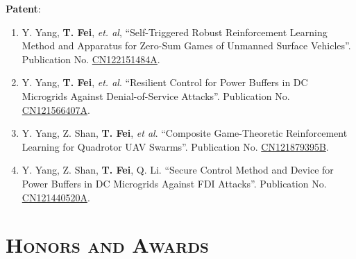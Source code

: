 \documentclass[a4paper,11pt]{article}
\begin{document}
\begin{itemize}[leftmargin=0in, label={}]
  \small{\item{\textbf{Patent}:}}
  \begin{enumerate}[leftmargin=0.24in, start=10]
  	\item \small{Y. Yang, \textbf{T. Fei}, \textit{et. al}, “Self-Triggered Robust Reinforcement Learning Method and Apparatus for Zero-Sum Games of Unmanned Surface Vehicles”. Publication No. \href{https://pss-system.cponline.cnipa.gov.cn/documents/detail?prevPageTit=changgui}{CN122151484A}.}
  	
  	\item \small{Y. Yang, \textbf{T. Fei}, \textit{et. al}.
  		“Resilient Control for Power Buffers in DC Microgrids Against Denial-of-Service Attacks”.
  		Publication No. \href{https://pss-system.cponline.cnipa.gov.cn/documents/detail?prevPageTit=changgui}{CN121566407A}.}
  	
  	\item \small{Y. Yang, Z. Shan, \textbf{T. Fei}, \textit{et al}. “Composite Game-Theoretic Reinforcement Learning for Quadrotor UAV Swarms”.
  		Publication No. \href{https://pss-system.cponline.cnipa.gov.cn/documents/detail?prevPageTit=changgui}{CN121879395B}.}
  	
  	\item \small{Y. Yang, Z. Shan, \textbf{T. Fei}, Q. Li. “Secure Control Method and Device for Power Buffers in DC Microgrids Against FDI Attacks”.
  		Publication No. \href{https://pss-system.cponline.cnipa.gov.cn/documents/detail?prevPageTit=changgui}{CN121440520A}.}
  \end{enumerate}
\end{itemize}


\section{\textsc{\Large{Honors and Awards}}}
\end{document}
